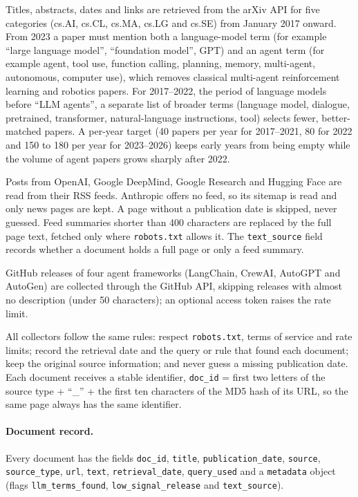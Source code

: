 \documentclass[11pt,a4paper]{article}
\newcommand{\code}[1]{\texttt{#1}}
\begin{document}
\begin{description}[leftmargin=0.5cm,style=nextline]
\item[Research papers.] Titles, abstracts, dates and links are retrieved from the arXiv API for five
categories (cs.AI, cs.CL, cs.MA, cs.LG and cs.SE) from January 2017 onward. From 2023 a paper must mention both
a language-model term (for example ``large language model'', ``foundation model'', GPT) and an agent term
(for example agent, tool use, function calling, planning, memory, multi-agent, autonomous, computer use), which
removes classical multi-agent reinforcement learning and robotics papers. For 2017--2022, the period of
language models before ``LLM agents'', a separate list of broader terms (language model, dialogue, pretrained,
transformer, natural-language instructions, tool) selects fewer, better-matched papers. A per-year target
(40 papers per year for 2017--2021, 80 for 2022 and 150 to 180 per year for 2023--2026) keeps early years from
being empty while the volume of agent papers grows sharply after 2022.
\item[Laboratory and company blogs.] Posts from OpenAI, Google DeepMind, Google Research and Hugging Face are
read from their RSS feeds. Anthropic offers no feed, so its sitemap is read and only news pages are kept. A page
without a publication date is skipped, never guessed. Feed summaries shorter than 400 characters are replaced
by the full page text, fetched only where \code{robots.txt} allows it. The \code{text\_source} field records
whether a document holds a full page or only a feed summary.
\item[Release notes.] GitHub releases of four agent frameworks (LangChain, CrewAI, AutoGPT and AutoGen) are
collected through the GitHub API, skipping releases with almost no description (under 50 characters); an
optional access token raises the rate limit.
\end{description}

All collectors follow the same rules: respect \code{robots.txt}, terms of service and rate limits; record the
retrieval date and the query or rule that found each document; keep the original source information; and never
guess a missing publication date. Each document receives a stable identifier,
\code{doc\_id} = first two letters of the source type + ``\_'' + the first ten characters of the MD5 hash of its URL, so
the same page always has the same identifier.

\paragraph{Document record.} Every document has the fields \code{doc\_\allowbreak{}id}, \code{title}, \code{publication\_\allowbreak{}date},
\code{source}, \code{source\_\allowbreak{}type}, \code{url}, \code{text}, \code{retrieval\_\allowbreak{}date}, \code{query\_\allowbreak{}used} and a
\code{metadata} object (flags \code{llm\_\allowbreak{}terms\_\allowbreak{}found}, \code{low\_\allowbreak{}signal\_\allowbreak{}release} and \code{text\_\allowbreak{}source}).
\end{document}
